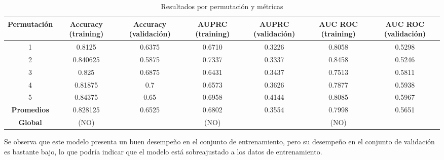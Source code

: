 \documentclass[12pt,a4paper]{article}
\begin{document}
\begin{table}[H]
    \centering
    \begin{tabular}{|c|c|c|c|c|c|c|}
    \hline
    \textbf{Permutación} & \textbf{Accuracy} (training) & \textbf{Accuracy} (validación) & \textbf{AUPRC} (training) & \textbf{AUPRC} (validación) & \textbf{AUC ROC} (training) & \textbf{AUC ROC} (validación) \\
    \hline
    1 & 0.8125   & 0.6375 & 0.6710 & 0.3226 & 0.8058 & 0.5298 \\
    \hline
    2 & 0.840625 & 0.5875 & 0.7337 & 0.3337 & 0.8458 & 0.5246 \\
    \hline
    3 & 0.825    & 0.6875 & 0.6431 & 0.3437 & 0.7513 & 0.5811 \\
    \hline
    4 & 0.81875  & 0.7    & 0.6573 & 0.3626 & 0.7877 & 0.5938 \\
    \hline
    5 & 0.84375  & 0.65   & 0.6958 & 0.4144 & 0.8085 & 0.5967 \\
    \hline  
    \textbf{Promedios} &  0.828125 & 0.6525 & 0.6802 & 0.3554 & 0.7998 & 0.5651 \\
    \hline
    \textbf{Global} & (NO) &  & (NO) &  & (NO) &  \\
    \hline
    \end{tabular}
\caption{Resultados por permutación y métricas}
\label{tab:resultados-permutaciones}
\end{table}


Se observa que este modelo presenta un buen desempeño en el conjunto de entrenamiento, pero su desempeño en el conjunto de validación es bastante bajo, lo que podría indicar que el modelo está sobreajustado a los datos de entrenamiento.
\end{document}
